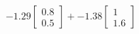 \documentclass[preview]{standalone}
\begin{document}
\begin{align*}
-1.29 \begin{bmatrix} 0.8 \\ 0.5 \end{bmatrix} + -1.38 \begin{bmatrix} 1 \\ 1.6 \end{bmatrix}
\end{align*}
\end{document}
